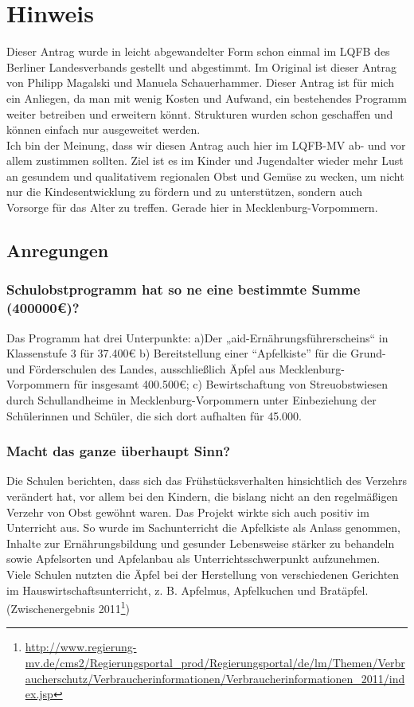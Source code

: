 \section{Hinweis}

Dieser Antrag wurde in leicht abgewandelter Form schon einmal im LQFB des Berliner Landesverbands gestellt und abgestimmt. Im Original ist dieser Antrag von Philipp Magalski und Manuela Schauerhammer. Dieser Antrag ist für mich ein Anliegen, da man mit wenig Kosten und Aufwand, ein bestehendes Programm weiter betreiben und erweitern könnt. Strukturen wurden schon geschaffen und können einfach nur ausgeweitet werden.\\Ich bin der Meinung, dass wir diesen Antrag auch hier im LQFB-MV ab- und vor allem zustimmen sollten. Ziel ist es im Kinder und Jugendalter wieder mehr Lust an gesundem und qualitativem regionalen Obst und Gemüse zu wecken, um nicht nur die Kindesentwicklung zu fördern und zu unterstützen, sondern auch Vorsorge für das Alter zu treffen. Gerade hier in Mecklenburg-Vorpommern.

\subsection{Anregungen}

\subsubsection{Schulobstprogramm hat so ne eine bestimmte Summe (400000€)?}

Das Programm hat drei Unterpunkte: a)Der „aid-Ernährungsführerscheins`` in Klassenstufe 3 für 37.400€ b) Bereitstellung einer ``Apfelkiste'' für die Grund- und Förderschulen des Landes, ausschließlich Äpfel aus Mecklenburg-Vorpommern für insgesamt 400.500€; c) Bewirtschaftung von Streuobstwiesen durch Schullandheime in Mecklenburg-Vorpommern unter Einbeziehung der Schülerinnen und Schüler, die sich dort aufhalten für 45.000.

\subsubsection{Macht das ganze überhaupt Sinn?}

Die Schulen berichten, dass sich das Frühstücksverhalten hinsichtlich des Verzehrs verändert hat, vor allem bei den Kindern, die bislang nicht an den regelmäßigen Verzehr von Obst gewöhnt waren. Das Projekt wirkte sich auch positiv im Unterricht aus. So wurde im Sachunterricht die Apfelkiste als Anlass genommen, Inhalte zur Ernährungsbildung und gesunder Lebensweise stärker zu behandeln sowie Apfelsorten und Apfelanbau als Unterrichtsschwerpunkt aufzunehmen. Viele Schulen nutzten die Äpfel bei der Herstellung von verschiedenen Gerichten im Hauswirtschaftsunterricht, z. B. Apfelmus, Apfelkuchen und Bratäpfel.(Zwischenergebnis 2011\footnote{\url{http://www.regierung-mv.de/cms2/Regierungsportal\_prod/Regierungsportal/de/lm/Themen/Verbraucherschutz/Verbraucherinformationen/Verbraucherinformationen\_2011/index.jsp}})

